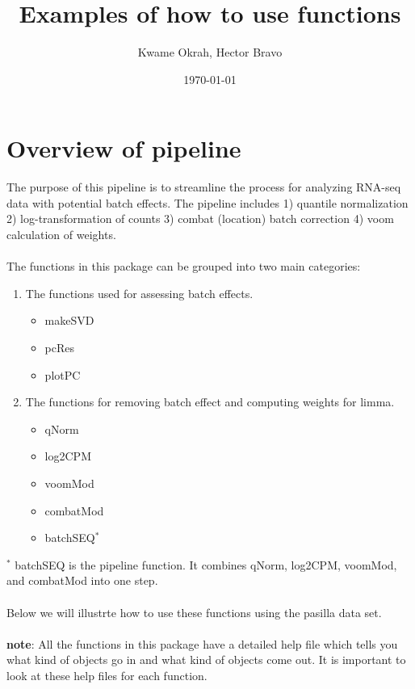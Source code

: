 \documentclass{article}
\title{Examples of how to use functions}
\author{Kwame Okrah, Hector Bravo}
\date{\today}
\begin{document}

\maketitle

\section{Overview of pipeline}
The purpose of this pipeline is to streamline the process for analyzing RNA-seq data
with potential batch effects. The pipeline includes 1) quantile normalization 2) log-transformation of counts 3) combat (location) batch correction 4) voom calculation of weights.\\\\
The functions in this package can be grouped into two main categories:

\begin{enumerate}
\item The functions used for assessing batch effects.
    \begin{itemize}
    \item makeSVD
    \item pcRes
    \item plotPC
    \end{itemize}
\item The functions for removing batch effect and computing weights for limma.
    \begin{itemize}
    \item qNorm
    \item log2CPM
    \item voomMod
    \item combatMod
    \item batchSEQ$^*$
    \end{itemize}
\end{enumerate}
$^*$ batchSEQ is the pipeline function. It combines qNorm, log2CPM, voomMod, and combatMod
into one step.\\\\
Below we will illustrte how to use these functions using the pasilla data set.\\\\
{\bf note}: All the functions in this package have a detailed help file which tells you
what kind of objects go in and what kind of objects come out. It is important to look
at these help files for each function.
\end{document}
